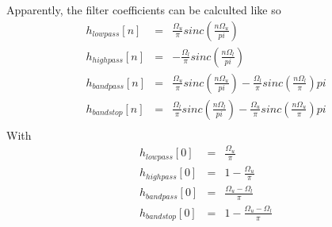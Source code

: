 \documentclass{article}
\begin{document}
Apparently, the filter coefficients can be calculted like so
\begin{eqnarray*}
h_{lowpass}[n]&=& \frac{\Omega_u}{\pi}sinc \left(\frac{n\Omega_u}{pi}\right)\\
h_{highpass}[n]&=&-\frac{\Omega_l}{\pi}sinc \left(\frac{n\Omega_l}{pi}\right) \\
h_{bandpass}[n]&=& \frac{\Omega_u}{\pi}sinc \left(\frac{n\Omega_u}{pi}\right)-\frac{\Omega_l}{\pi}sinc \left(\frac{n\Omega_l}{\pi}\right){pi}\\
h_{bandstop}[n]&=& \frac{\Omega_l}{\pi}sinc \left(\frac{n\Omega_l}{pi}\right)-\frac{\Omega_u}{\pi}sinc \left(\frac{n\Omega_u}{\pi}\right){pi}\\
\end{eqnarray*}
With
\begin{eqnarray*}
h_{lowpass}[0]&=&\frac{\Omega_u}{\pi}\\
h_{highpass}[0]&=&1-\frac{\Omega_u}{\pi}\\
h_{bandpass}[0]&=&\frac{\Omega_u-\Omega_l}{\pi}\\
h_{bandstop}[0]&=&1-\frac{\Omega_u-\Omega_l}{\pi}\\
\end{eqnarray*}
\end{document}
